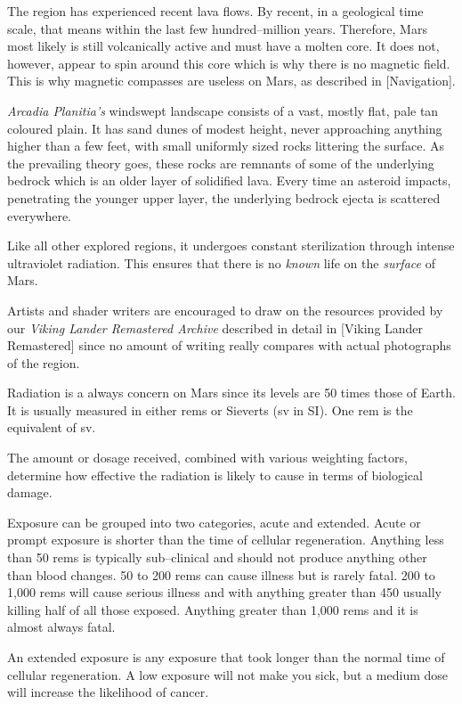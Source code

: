 The region has experienced recent lava flows. By recent, in a geological time scale, that means within the last few hundred--million years. Therefore, Mars most likely is still volcanically active and must have a molten core. It does not, however, appear to spin around this core which is why there is no magnetic field. This is why magnetic compasses are useless on Mars, as described in [Navigation].

{\it Arcadia Planitia's} windswept landscape consists of a vast, mostly flat, pale tan coloured plain. It has sand dunes of modest height, never approaching anything higher than a few feet, with small uniformly sized rocks littering the surface. As the prevailing theory goes, these rocks are remnants of some of the underlying bedrock which is an older layer of solidified lava. Every time an asteroid impacts, penetrating the younger upper layer, the underlying bedrock ejecta is scattered everywhere.

Like all other explored regions, it undergoes constant sterilization through intense ultraviolet radiation. This ensures that there is no {\it known} life on the {\it surface} of Mars.

Artists and shader writers are encouraged to draw on the resources provided by our {\it Viking Lander Remastered Archive} described in detail in [Viking Lander Remastered] since no amount of writing really compares with actual photographs of the region.


Radiation is a always concern on Mars since its levels are 50 times those of Earth. It is usually measured in either rems or Sieverts (sv in SI). One rem is the equivalent of  sv.

The amount or dosage received, combined with various weighting factors, determine how effective the radiation is likely to cause in terms of biological damage.

Exposure can be grouped into two categories, acute and extended. Acute or prompt exposure is shorter than the time of cellular regeneration. Anything less than 50 rems is typically sub--clinical and should not produce anything other than blood changes. 50 to 200 rems can cause illness but is rarely fatal. 200 to 1,000 rems will cause serious illness and with anything greater than 450 usually killing half of all those exposed. Anything greater than 1,000 rems and it is almost always fatal.

An extended exposure is any exposure that took longer than the normal time of cellular regeneration. A low exposure will not make you sick, but a medium dose will increase the likelihood of cancer.

